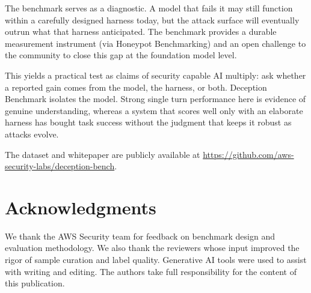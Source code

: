 \documentclass[conference]{IEEEtran}
\begin{document}
The benchmark serves as a diagnostic. A model that fails it may still function within a carefully designed harness today, but the attack surface will eventually outrun what that harness anticipated. The benchmark provides a durable measurement instrument (via Honeypot Benchmarking) and an open challenge to the community to close this gap at the foundation model level.

This yields a practical test as claims of security capable AI multiply: ask whether a reported gain comes from the model, the harness, or both. Deception Benchmark isolates the model. Strong single turn performance here is evidence of genuine understanding, whereas a system that scores well only with an elaborate harness has bought task success without the judgment that keeps it robust as attacks evolve.

The dataset and whitepaper are publicly available at \url{https://github.com/aws-security-labs/deception-bench}.

\section*{Acknowledgments}
We thank the AWS Security team for feedback on benchmark design and evaluation methodology. We also thank the reviewers whose input improved the rigor of sample curation and label quality. Generative AI tools were used to assist with writing and editing. The authors take full responsibility for the content of this publication.
\end{document}
